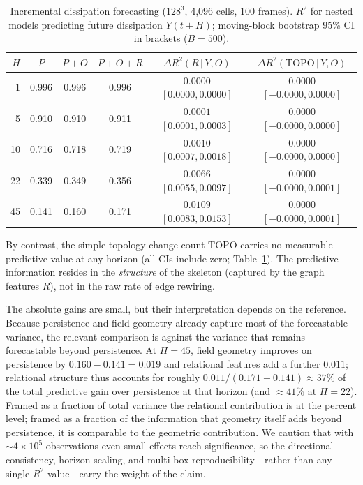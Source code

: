 \documentclass[11pt,a4paper]{article}
\begin{document}
\begin{table}[h]
\centering
\caption{Incremental dissipation forecasting ($128^3$, 4{,}096 cells, 100 frames). $R^2$ for nested models predicting future dissipation $Y(t{+}H)$; moving-block bootstrap 95\% CI in brackets ($B=500$).}
\label{tab:main}
\begin{tabular}{rccccc}
\toprule
$H$ & $P$ & $P{+}O$ & $P{+}O{+}R$ & $\Delta R^2(R\,|\,Y,O)$ & $\Delta R^2(\mathrm{TOPO}\,|\,Y,O)$ \\
\midrule
1  & 0.996 & 0.996 & 0.996 & $0.0000$ $[0.0000,0.0000]$ & $0.0000$ $[-0.0000,0.0000]$ \\
5  & 0.910 & 0.910 & 0.911 & $0.0001$ $[0.0001,0.0003]$ & $0.0000$ $[-0.0000,0.0000]$ \\
10 & 0.716 & 0.718 & 0.719 & $0.0010$ $[0.0007,0.0018]$ & $0.0000$ $[-0.0000,0.0000]$ \\
22 & 0.339 & 0.349 & 0.356 & $0.0066$ $[0.0055,0.0097]$ & $0.0000$ $[-0.0000,0.0001]$ \\
45 & 0.141 & 0.160 & 0.171 & $0.0109$ $[0.0083,0.0153]$ & $0.0000$ $[-0.0000,0.0001]$ \\
\bottomrule
\end{tabular}
\end{table}

By contrast, the simple topology-change count $\mathrm{TOPO}$ carries no measurable predictive value at any horizon (all CIs include zero; Table~\ref{tab:main}). The predictive information resides in the \emph{structure} of the skeleton (captured by the graph features $R$), not in the raw rate of edge rewiring.

The absolute gains are small, but their interpretation depends on the reference. Because persistence and field geometry already capture most of the forecastable variance, the relevant comparison is against the variance that remains forecastable beyond persistence. At $H=45$, field geometry improves on persistence by $0.160-0.141 = 0.019$ and relational features add a further $0.011$; relational structure thus accounts for roughly $0.011/(0.171-0.141) \approx 37\%$ of the total predictive gain over persistence at that horizon (and $\approx 41\%$ at $H=22$). Framed as a fraction of total variance the relational contribution is at the percent level; framed as a fraction of the information that geometry itself adds beyond persistence, it is comparable to the geometric contribution. We caution that with $\sim$$4\times10^5$ observations even small effects reach significance, so the directional consistency, horizon-scaling, and multi-box reproducibility---rather than any single $R^2$ value---carry the weight of the claim.
\end{document}
